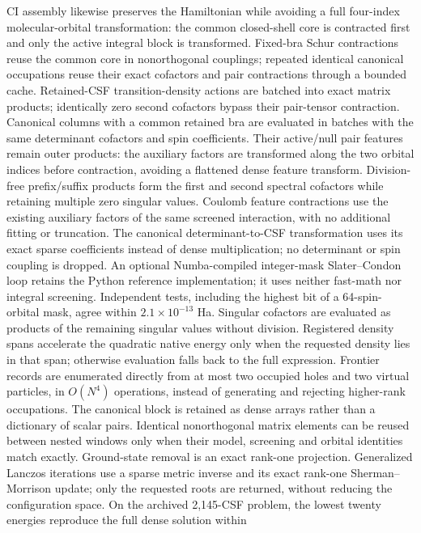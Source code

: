 CI assembly likewise preserves the Hamiltonian while avoiding a full
four-index molecular-orbital transformation: the common closed-shell core
is contracted first and only the active integral block is transformed.
Fixed-bra Schur contractions reuse the common core in nonorthogonal
couplings; repeated identical canonical occupations reuse their exact
cofactors and pair contractions through a bounded cache. Retained-CSF
transition-density actions are batched into exact matrix products; identically
zero second cofactors bypass their pair-tensor contraction. Canonical columns
with a common retained bra are evaluated in batches with the same determinant
cofactors and spin coefficients. Their active/null pair features remain outer
products: the auxiliary factors are transformed along the two orbital indices
before contraction, avoiding a flattened dense feature transform. Division-free prefix/suffix
products form the first and second spectral cofactors while retaining
multiple zero singular values. Coulomb
feature contractions use the existing auxiliary factors of the same
screened interaction, with no additional fitting or truncation. The canonical
determinant-to-CSF transformation uses its exact sparse coefficients
instead of dense multiplication; no determinant or spin coupling is
dropped. An optional Numba-compiled integer-mask Slater--Condon loop
retains the Python reference implementation; it uses neither fast-math
nor integral screening. Independent tests, including the highest bit of
a 64-spin-orbital mask, agree within $2.1\times10^{-13}$ Ha.
Singular cofactors are evaluated as products of the remaining
singular values without division. Registered density spans accelerate the
quadratic native energy only when the requested density lies in that span;
otherwise evaluation falls back to the full expression.
Frontier records are enumerated directly from at most two occupied holes
and two virtual particles, in $O(N^4)$ operations, instead of generating
and rejecting higher-rank occupations. The canonical block is retained
as dense arrays rather than a dictionary of scalar pairs. Identical
nonorthogonal matrix elements can be reused between nested windows only
when their model, screening and orbital identities match exactly.
Ground-state removal is an exact rank-one projection. Generalized
Lanczos iterations use a sparse metric inverse and its exact rank-one
Sherman--Morrison update; only the requested roots are returned, without
reducing the configuration space. On the archived 2,145-CSF problem,
the lowest twenty energies reproduce the full dense solution within
